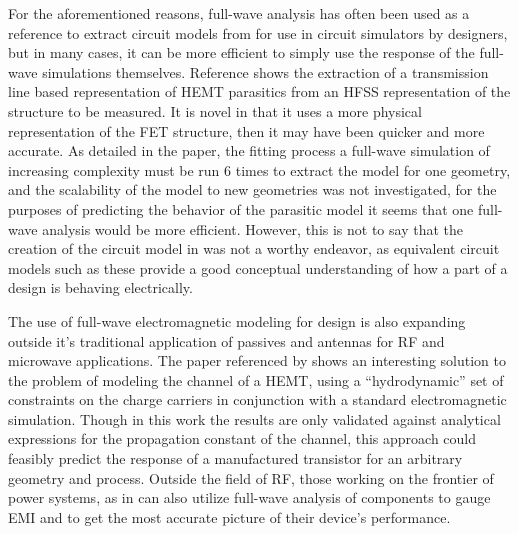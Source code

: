 \documentclass[12pt]{usfcoe}
\begin{document}
    For the aforementioned reasons, full-wave analysis has often been used as a reference to extract circuit models from for use in circuit simulators by designers, but in many cases, it can be more efficient to simply use the response of the full-wave simulations themselves. 
    Reference \cite{HEMTDistributedCircuitExtraction} shows the extraction of a transmission line based representation of HEMT parasitics from an HFSS representation of the structure to be measured. 
    It is novel in that it uses a more physical representation of the FET structure, then it may have been quicker and more accurate. 
    As detailed in the paper, the fitting process a full-wave simulation of increasing complexity must be run 6 times to extract the model for one geometry, and the scalability of the model to new geometries was not investigated, for the purposes of predicting the behavior of the parasitic model it seems that one full-wave analysis would be more efficient.
    However, this is not to say that the creation of the circuit model in \cite{HEMTDistributedCircuitExtraction} was not a worthy endeavor, as equivalent circuit models such as these provide a good conceptual understanding of how a part of a design is behaving electrically.

    The use of full-wave electromagnetic modeling for design is also expanding outside it's traditional application of passives and antennas for RF and microwave applications.
    The paper referenced by \cite{FullWaveHemt} shows an interesting solution to the problem of modeling the channel of a HEMT, using a ``hydrodynamic'' set of constraints on the charge carriers in conjunction with a standard electromagnetic simulation.
    Though in this work the results are only validated against analytical expressions for the propagation constant of the channel, this approach could feasibly predict the response of a manufactured transistor for an arbitrary geometry and process.
    Outside the field of RF, those working on the frontier of power systems, as in \cite{FullWaveHighFrequencyLModeling} can also utilize full-wave analysis of components to gauge EMI and to get the most accurate picture of their device's performance.
\end{document}
